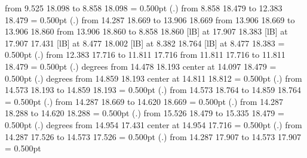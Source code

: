 {{\color[rgb]{0,0,0}\putrule from  9.525 18.098 to  8.858 18.098
}%
%
%
\linethickness= 0.500pt
\setplotsymbol ({\thinlinefont .})
{\color[rgb]{0,0,0}\putrule from  8.858 18.479 to 12.383 18.479
}%
%
%
\linethickness= 0.500pt
\setplotsymbol ({\thinlinefont .})
{\color[rgb]{0,0,0}\putrule from 14.287 18.669 to 13.906 18.669
\putrule from 13.906 18.669 to 13.906 18.860
\putrule from 13.906 18.860 to  8.858 18.860
}%
%
%
 [lB] at 17.907 18.383
%
%
 [lB] at 17.907 17.431
%
%
 [lB] at  8.477 18.002
%
%
 [lB] at  8.382 18.764
%
%
 [lB] at  8.477 18.383
%
%
\linethickness= 0.500pt
\setplotsymbol ({\thinlinefont .})
{\color[rgb]{0,0,0}\putrule from 12.383 17.716 to 11.811 17.716
\putrule from 11.811 17.716 to 11.811 18.479
}%
%
%
\linethickness= 0.500pt
\setplotsymbol ({\thinlinefont .})
{\color[rgb]{0,0,0} degrees from 14.478 18.193 center at 14.097 18.479
}%
%
%
\linethickness= 0.500pt
\setplotsymbol ({\thinlinefont .})
{\color[rgb]{0,0,0} degrees from 14.859 18.193 center at 14.811 18.812
}%
%
%
\linethickness= 0.500pt
\setplotsymbol ({\thinlinefont .})
{\color[rgb]{0,0,0}\putrule from 14.573 18.193 to 14.859 18.193
}%
%
%
\linethickness= 0.500pt
\setplotsymbol ({\thinlinefont .})
{\color[rgb]{0,0,0}\putrule from 14.573 18.764 to 14.859 18.764
}%
%
%
\linethickness= 0.500pt
\setplotsymbol ({\thinlinefont .})
{\color[rgb]{0,0,0}\putrule from 14.287 18.669 to 14.620 18.669
}%
%
%
\linethickness= 0.500pt
\setplotsymbol ({\thinlinefont .})
{\color[rgb]{0,0,0}\putrule from 14.287 18.288 to 14.620 18.288
}%
%
%
\linethickness= 0.500pt
\setplotsymbol ({\thinlinefont .})
{\color[rgb]{0,0,0}\putrule from 15.526 18.479 to 15.335 18.479
}%
%
%
\linethickness= 0.500pt
\setplotsymbol ({\thinlinefont .})
{\color[rgb]{0,0,0} degrees from 14.954 17.431 center at 14.954 17.716
}%
%
%
\linethickness= 0.500pt
\setplotsymbol ({\thinlinefont .})
{\color[rgb]{0,0,0}\putrule from 14.287 17.526 to 14.573 17.526
}%
%
%
\linethickness= 0.500pt
\setplotsymbol ({\thinlinefont .})
{\color[rgb]{0,0,0}\putrule from 14.287 17.907 to 14.573 17.907
}%
%
%
\linethickness= 0.500pt
}
